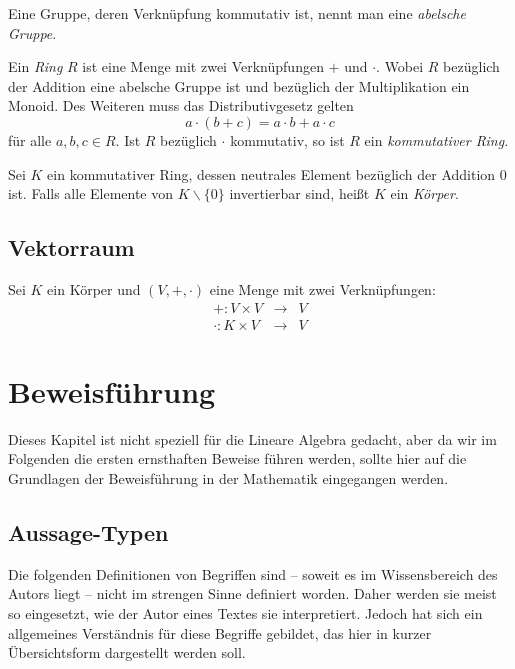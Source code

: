 \begin{definition}
Eine Gruppe, deren Verknüpfung kommutativ ist, nennt man eine \textsl{abelsche Gruppe}.
\end{definition}

\begin{definition}
Ein \textsl{Ring} $R$ ist eine Menge mit zwei Verknüpfungen $+$ und $\cdot$. Wobei $R$ bezüglich der Addition eine abelsche Gruppe ist und bezüglich der Multiplikation ein Monoid. Des Weiteren muss das Distributivgesetz gelten
\[ a\cdot (b+c) = a\cdot b + a\cdot c \]
für alle $a,b,c \in R$. Ist $R$ bezüglich $\cdot$ kommutativ, so ist $R$ ein \textsl{kommutativer Ring}.
\end{definition}

\begin{definition}
Sei $K$ ein kommutativer Ring, dessen neutrales Element bezüglich der Addition $0$ ist. Falls alle Elemente von $K\backslash \{0\}$ invertierbar sind, heißt $K$ ein \textsl{Körper}.
\end{definition}

\section{Vektorraum}

Sei $K$ ein Körper und $(V,+,\cdot)$ eine Menge mit zwei Verknüpfungen:
\begin{eqnarray*}
+: V\times V &\longrightarrow& V \\
\cdot: K \times V &\longrightarrow& V 
\end{eqnarray*}

\chapter{Beweisführung}

Dieses Kapitel ist nicht speziell für die Lineare Algebra gedacht, aber da wir im Folgenden die ersten ernsthaften Beweise führen werden, sollte hier auf die Grundlagen der Beweisführung in der Mathematik eingegangen werden.

\section{Aussage-Typen}

Die folgenden Definitionen von Begriffen sind -- soweit es im Wissensbereich des Autors liegt -- nicht im strengen Sinne definiert worden. Daher werden sie meist so eingesetzt, wie der Autor eines Textes sie interpretiert. Jedoch hat sich ein allgemeines Verständnis für diese Begriffe gebildet, das hier in kurzer Übersichtsform dargestellt werden soll.

